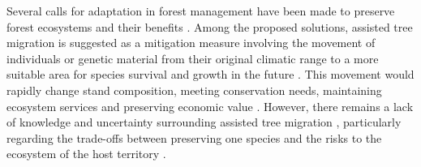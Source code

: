 Several calls for adaptation in forest management have been made to preserve forest ecosystems and their benefits \citep{Messier2021sakeresilience,Nagel2017Adaptivesilviculture}. 
Among the proposed solutions, assisted tree migration is suggested as a mitigation measure involving the movement of individuals or genetic material from their original climatic range to a more suitable area for species survival and growth in the future \citep{Dumroese2015Considerationsrestoring,Palik2022Operationalizingforestassisted,Park2023Provenancetrials,Park2018Informationunderload,Pedlar2011implementationassisted,Vitt2010Assistedmigration,Williams2013Preparingclimate}. 
This movement would rapidly change stand composition, meeting conservation needs, maintaining ecosystem services and preserving economic value \citep{Pedlar2011implementationassisted,Ste-Marie2011Assistedmigration,Winder2011Ecologicalimplications}. 
However, there remains a lack of knowledge and uncertainty surrounding assisted tree migration \citep{Park2018Informationunderload,Klenk2015assistedmigration}, particularly regarding the trade-offs between preserving one species and the risks to the ecosystem of the host territory \citep{Hewitt2011Takingstock,McLachlan2007frameworkdebate,Vitt2010Assistedmigration}.

